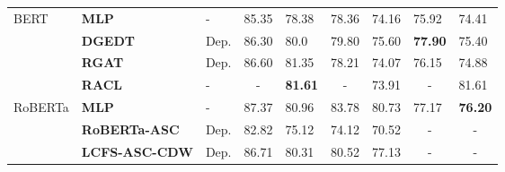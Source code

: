 \documentclass[11pt]{article}
\begin{document}
\begin{table*}[!ht]
\begin{tabular}{m{3cm}m{3.3cm}m{2.5cm}m{1.15cm}<{\centering}m{1.15cm}<{\centering}m{1.15cm}<{\centering}m{1.15cm}<{\centering}m{1.15cm}<{\centering}m{1.15cm}<{\centering}}
    \midrule
    \multirow{4}{*}{BERT}             & \textbf{MLP          }                    & -                               & 85.35                             & 78.38                              & 78.36                             & 74.16                              & 75.92                             & 74.41                              \\
                                      & \textbf{DGEDT          }         & Dep.                            & 86.30                             & 80.0                               & 79.80                             & 75.60                              & \textbf{77.90}                    & 75.40                              \\
                                      & \textbf{RGAT         }           & Dep.                            & 86.60                             & 81.35                              & 78.21                             & 74.07                              & 76.15                             & 74.88                              \\
                                      & \textbf{RACL         }           & -                               & \multicolumn{1}{c}{-}             & \textbf{81.61}                     & \multicolumn{1}{c}{-}             & 73.91                              & \multicolumn{1}{c}{-}             & 81.61                              \\
    \midrule
    \multirow{9}{*}{RoBERTa}          & \textbf{MLP          }                    & -                               & 87.37                             & 80.96                              & 83.78                             & 80.73                              & 77.17                             & \textbf{76.20}                     \\
                                      & \textbf{RoBERTa-ASC  }           & Dep.                            & 82.82                             & 75.12                              & 74.12                             & 70.52                              & \multicolumn{1}{c}{-}             & \multicolumn{1}{c}{-}              \\
                                      & \textbf{LCFS-ASC-CDW }           & Dep.                            & 86.71                             & 80.31                              & 80.52                             & 77.13                              & \multicolumn{1}{c}{-}             & \multicolumn{1}{c}{-}              \\

\end{tabular}
\end{table*}
\end{document}
